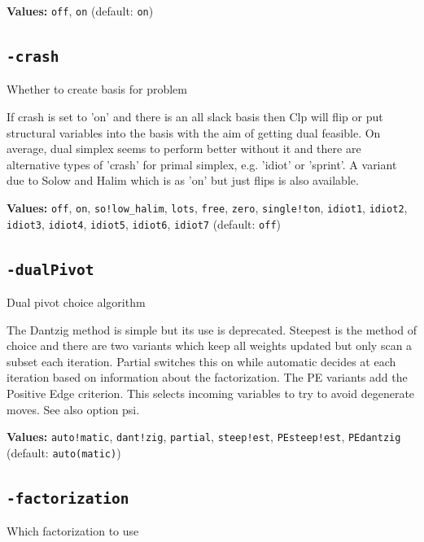 \documentclass[11pt,a4paper]{article}
\begin{document}
\textbf{Values:} \texttt{off}, \texttt{on} (default: \texttt{on})

\subsection*{\texttt{-crash}}

Whether to create basis for problem

If crash is set to 'on' and there is an all slack basis then Clp will flip or put structural variables into the basis with the aim of getting dual feasible.  On average, dual simplex seems to perform better without it and there are alternative types of 'crash' for primal simplex, e.g. 'idiot' or 'sprint'. A variant due to Solow and Halim which is as 'on' but just flips is also available.

\textbf{Values:} \texttt{off}, \texttt{on}, \texttt{so!low\_halim}, \texttt{lots}, \texttt{free}, \texttt{zero}, \texttt{single!ton}, \texttt{idiot1}, \texttt{idiot2}, \texttt{idiot3}, \texttt{idiot4}, \texttt{idiot5}, \texttt{idiot6}, \texttt{idiot7} (default: \texttt{off})

\subsection*{\texttt{-dualPivot}}

Dual pivot choice algorithm

The Dantzig method is simple but its use is deprecated.  Steepest is the method of choice and there are two variants which keep all weights updated but only scan a subset each iteration. Partial switches this on while automatic decides at each iteration based on information about the factorization. The PE variants add the Positive Edge criterion. This selects incoming variables to try to avoid degenerate moves. See also option psi.

\textbf{Values:} \texttt{auto!matic}, \texttt{dant!zig}, \texttt{partial}, \texttt{steep!est}, \texttt{PEsteep!est}, \texttt{PEdantzig} (default: \texttt{auto(matic)})

\subsection*{\texttt{-factorization}}

Which factorization to use
\end{document}
